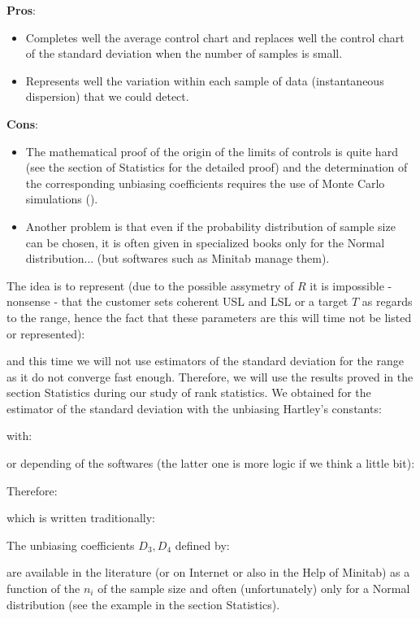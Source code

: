 	\textbf{Pros}:
	\begin{itemize}
		\item Completes well the average control chart and replaces well the control chart of the standard deviation when the number of samples is small. 

		\item Represents well the variation within each sample of data (instantaneous dispersion) that we could detect.
	\end{itemize}

	\textbf{Cons}:
	\begin{itemize}
		\item The mathematical proof of the origin of the limits of controls is quite hard (see the section of Statistics for the detailed proof) and the determination of the corresponding unbiasing coefficients requires the use of Monte Carlo simulations (). 

		\item Another problem is that even if the probability distribution of sample size can be chosen, it is often given in specialized books only for the Normal distribution... (but softwares such as Minitab manage them).
 	\end{itemize}
 	The idea is to represent (due to the possible assymetry of $R$ it is impossible - nonsense - that the customer sets coherent USL and LSL or a target $T$ as regards to the range, hence the fact that these parameters are this will time not be listed or represented):
 	
	and this time we will not use estimators of the standard deviation for the range as it do not converge fast enough. Therefore, we will use the results proved in the section Statistics during our study of rank statistics. We obtained for the estimator of the standard deviation with the unbiasing Hartley's constants:
	
	with:
	
	or depending of the softwares (the latter one is more logic if we think a little bit):
	
	Therefore:
	
	which is written traditionally:
	
	The unbiasing coefficients $D_3,D_4$ defined by:
	
	are available in the literature (or on Internet or also in the Help of Minitab) as a function of the $n_i$ of the sample size and often (unfortunately) only for a Normal distribution (see the example in the section Statistics).
	
